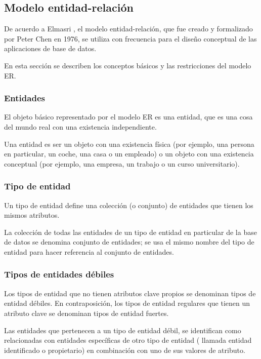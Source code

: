 
\subsection{Modelo entidad-relación}

De acuerdo a Elmasri \cite{ramez_elmasri_fundamentos_nodate}, el modelo entidad-relación, que fue creado y formalizado por Peter Chen en 1976\cite{chen_entity-relationship_nodate}, se utiliza con frecuencia para el diseño conceptual de las aplicaciones de base de datos. 


En esta sección se describen los conceptos básicos y las restricciones del modelo ER. 

\subsubsection{Entidades}
El objeto básico representado por el modelo ER es una entidad, que es una cosa del mundo real con una existencia independiente.


Una entidad es ser un objeto con una existencia física (por ejemplo, una persona en particular, un coche, una casa o un empleado) o un objeto con una existencia conceptual (por ejemplo, una empresa, un trabajo o un curso universitario).

\subsubsection*{Tipo de entidad}

Un tipo de entidad define una colección (o conjunto) de entidades que tienen los mismos atributos.


La colección de todas las entidades de un tipo de entidad en particular de la base de datos se denomina conjunto de entidades; se usa el mismo nombre del tipo de entidad para hacer referencia al conjunto de entidades. 

\subsubsection*{Tipos de entidades débiles}

Los tipos de entidad que no tienen atributos clave propios se denominan tipos de entidad débiles. En contraposición, los tipos de entidad regulares que tienen un atributo clave se denominan tipos de entidad fuertes.


Las entidades que pertenecen a un tipo de entidad débil, se identifican como relacionadas con entidades específicas de otro tipo de entidad ( llamada entidad identificado o propietario) en combinación con uno de sus valores de atributo.


